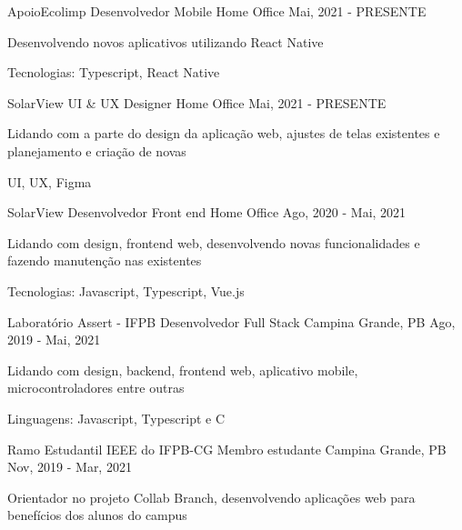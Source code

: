 
\begin{cventries}
  \cventry
  {ApoioEcolimp} %
  {Desenvolvedor Mobile} %
  {Home Office} %
  {Mai, 2021 - PRESENTE} %
  {
    \begin{cvitems} %
      \item {Desenvolvendo novos aplicativos utilizando React Native}
      \item {Tecnologias: Typescript, React Native}
    \end{cvitems}
  }

  \cventry
    {SolarView}
    {UI \& UX Designer}
    {Home Office}
    {Mai, 2021 - PRESENTE}
    {
      \begin{cvitems}
        \item {Lidando com a parte do design da aplicação web, ajustes de telas existentes e planejamento e criação de novas}
        \item {UI, UX, Figma}
      \end{cvitems}
    }

  \cventry
    {SolarView}
    {Desenvolvedor Front end}
    {Home Office}
    {Ago, 2020 - Mai, 2021}
    {
      \begin{cvitems}
        \item {Lidando com design, frontend web, desenvolvendo novas funcionalidades e fazendo manutenção nas existentes}
        \item {Tecnologias: Javascript, Typescript, Vue.js}
      \end{cvitems}
    }

  \cventry
    {Laboratório Assert - IFPB}
    {Desenvolvedor Full Stack}
    {Campina Grande, PB}
    {Ago, 2019 - Mai, 2021}
    {
      \begin{cvitems}
        \item {Lidando com design, backend, frontend web, aplicativo mobile, microcontroladores entre outras}
        \item {Linguagens: Javascript, Typescript e C}
      \end{cvitems}
    }

  \cventry
    {Ramo Estudantil IEEE do IFPB-CG}
    {Membro estudante}
    {Campina Grande, PB}
    {Nov, 2019 - Mar, 2021}
    {
      \begin{cvitems}
        \item {Orientador no projeto Collab Branch, desenvolvendo aplicações web para benefícios dos alunos do campus}
      \end{cvitems}
    }
    

\end{cventries}
